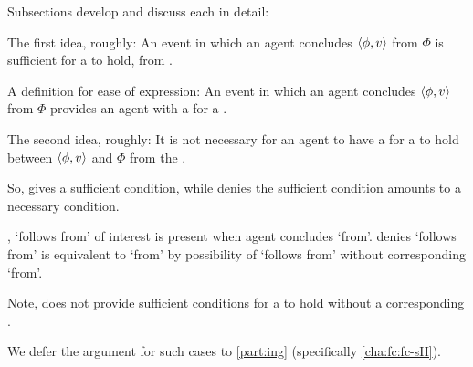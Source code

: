 \begin{note}
  Subsections develop and discuss each in detail:

  \begin{TOCEnum}
  \item

    The first idea, roughly:
    An event in which an agent concludes \(\langle \phi, v \rangle\) from \(\Phi\) is sufficient for a \ros{} to hold, from .
  \item

    A definition for ease of expression:
    An event in which an agent concludes \(\langle \phi, v \rangle\) from \(\Phi\) provides an agent with a  for a \ros{}.
  \item

    The second idea, roughly:
    It is not necessary for an agent to have a \wit{} for a \ros{} to hold between \(\langle \phi, v \rangle\) and \(\Phi\) from the \agpe{\agents{}}.
  \end{TOCEnum}
\end{note}

\begin{note}
  So, \supportI{} gives a sufficient condition, while \supportII{} denies the sufficient condition amounts to a necessary condition.

  \supportI{}, `follows from' of interest is present when agent concludes `from'.
  \supportII{} denies `follows from' is equivalent to `from' by possibility of `follows from' without corresponding `from'.
\end{note}

\begin{note}
  Note, \supportII{} does not provide sufficient conditions for a \ros{} to hold without a corresponding .

  We defer the argument for such cases to \autoref{part:ing} (specifically \autoref{cha:fc:fc-sII}).
\end{note}

\section{\supportI{}}
\label{cha:ros:I}

